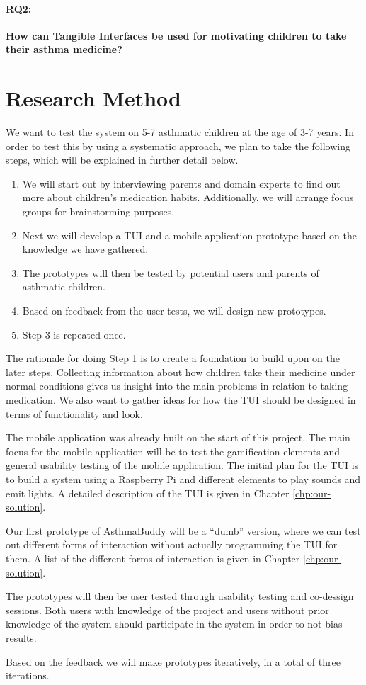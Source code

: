 \paragraph{RQ2:}
\textbf{How can Tangible Interfaces be used for motivating children to take their asthma medicine?}

\section{Research Method}
\label{sec:researchmethod}

We want to test the system on 5-7 asthmatic children at the age of 3-7 years. In order to test this by using a systematic approach, we plan to take the following steps, which will be explained in further detail below. 

\begin{enumerate}
  \item We will start out by interviewing parents and domain experts to find out more about children's medication habits. Additionally, we will arrange focus groups for brainstorming purposes.
  \item Next we will develop a TUI and a mobile application prototype based on the knowledge we have gathered.  
  \item The prototypes will then be tested by potential users and parents of asthmatic children. 
  \item Based on feedback from the user tests, we will design new prototypes.
  \item Step 3 is repeated once.
\end{enumerate}
 

The rationale for doing Step 1 is to create a foundation to build upon on the later steps. 
Collecting information about how children take their medicine under normal conditions gives us insight into the main problems in relation to taking medication. We also want to gather ideas for how the TUI should be designed in terms of functionality and look. 

The mobile application was already built on the start of this project. The main focus for the mobile application will be to test the gamification elements and general usability testing of the mobile application. The initial plan for the TUI is to build a system using a Raspberry Pi and different elements to play sounds and emit lights. A detailed description of the TUI is given in Chapter \ref{chp:our-solution}.

Our first prototype of AsthmaBuddy will be a ``dumb'' version, where we can test out different forms of interaction without actually programming the TUI for them. A list of the different forms of interaction is given in Chapter \ref{chp:our-solution}. 

The prototypes will then be user tested through usability testing and co-dessign sessions. Both users with knowledge of the project and users without prior knowledge of the system should participate in the system in order to not bias results. 

Based on the feedback we will make prototypes iteratively, in a total of three iterations.